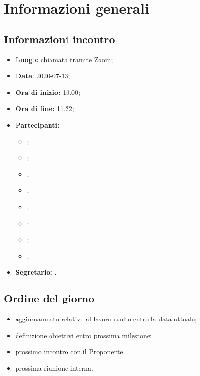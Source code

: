 \section{Informazioni generali}
\subsection{Informazioni incontro}
\begin{itemize}
	\item \textbf{Luogo:} chiamata tramite Zoom;
	\item \textbf{Data:} 2020-07-13;
	\item \textbf{Ora di inizio:} 10.00;
	\item \textbf{Ora di fine:} 11.22;
	\item \textbf{Partecipanti:}
		\begin{itemize}
			\item \VB;
			\item \LB;
			\item \NF;
			\item \EG;
			\item \FJ;
			\item \MP;
			\item \AS;
			\item \AZ.
		\end{itemize}
	\item \textbf{Segretario:} \LB.
\end{itemize}

\subsection{Ordine del giorno}
\begin{itemize}
	\item aggiornamento relativo al lavoro svolto entro la data attuale;
	\item definizione obiettivi entro prossima milestone;
	\item prossimo incontro con il Proponente.
	\item prossima riunione interna.
\end{itemize}
